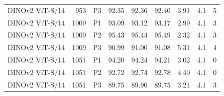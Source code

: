 {\begin{longtable}{lrlrrrrrr}
DINOv2 ViT-S/14 & 953 & P3 & 92.35 & 92.36 & 92.40 & 3.91 & 4.1 & 5 \\
DINOv2 ViT-S/14 & 1009 & P1 & 93.09 & 93.12 & 93.17 & 2.99 & 4.1 & 3 \\
DINOv2 ViT-S/14 & 1009 & P2 & 95.43 & 95.44 & 95.49 & 2.32 & 4.1 & 3 \\
DINOv2 ViT-S/14 & 1009 & P3 & 90.99 & 91.00 & 91.08 & 5.31 & 4.1 & 4 \\
DINOv2 ViT-S/14 & 1051 & P1 & 94.20 & 94.24 & 94.21 & 3.02 & 4.1 & 0 \\
DINOv2 ViT-S/14 & 1051 & P2 & 92.72 & 92.74 & 92.78 & 4.40 & 4.1 & 0 \\
DINOv2 ViT-S/14 & 1051 & P3 & 89.75 & 89.90 & 89.75 & 3.21 & 4.1 & 3 \\
\end{longtable}
}
